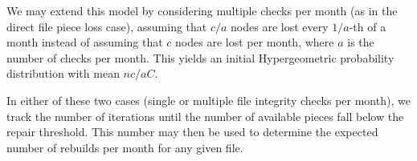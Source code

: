 We may extend this model by considering multiple checks per month (as in the direct file piece loss case), assuming that $c/a$ nodes are lost every $1/a$-th of a month instead of assuming that $c$ nodes are lost per month, where $a$ is the number of checks per month. This yields an initial Hypergeometric probability distribution with mean $nc/aC$.

In either of these two cases (single or multiple file integrity checks per month), we track the number of iterations until the number of available pieces fall below the repair threshold. This number may then be used to determine the expected number of rebuilds per month for any given file.
